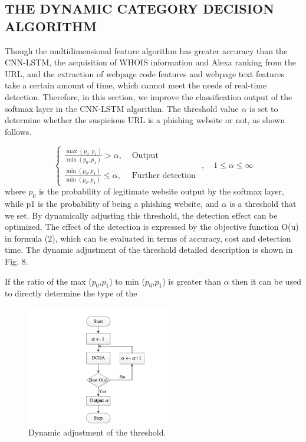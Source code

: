 \documentclass{ieeeaccess}
\begin{document}
\subsection{THE DYNAMIC CATEGORY DECISION ALGORITHM}
Though the multidimensional feature algorithm has greater
accuracy than the CNN-LSTM, the acquisition of WHOIS
information and Alexa ranking from the URL, and the extraction
of webpage code features and webpage text features take
a certain amount of time, which cannot meet the needs of
real-time detection. Therefore, in this section, we improve the
classification output of the softmax layer in the CNN-LSTM
algorithm. The threshold value $\alpha$ is set to determine whether
the suspicious URL is a phishing website or not, as shown
follows.\par
\begin{equation}
\left\{\begin{array}{ll}{\frac{\max \left(p_{0}, p_{1}\right)}{\min \left(p_{0}, p_{1}\right)}>\alpha,} & {\text { Output }} \\ {\frac{\min \left(p_{0}, p_{1}\right)}{\min \left(p_{0}, p_{1}\right)} \leq \alpha,} & {\text { Further detection }}\end{array}, \quad 1 \leq \alpha \leq \infty\right.
\end{equation}
where $p_{0}$ is the probability of legitimate website output by the softmax layer, while p1 is the probability of being a phishing
website, and $\alpha$ is a threshold that we set. By dynamically
adjusting this threshold, the detection effect can be optimized.
The effect of the detection is expressed by the objective
function O(u) in formula (2), which can be evaluated in terms
of accuracy, cost and detection time. The dynamic adjustment
of the threshold detailed description is shown in Fig. 8.
\par If the ratio of the max ($p_{0}$,$p_{1}$) to min ($p_{0}$,$p_{1}$) is greater than $\alpha$ then it can be used to directly determine the type of the
\begin{figure}
    \centering
    \includegraphics[width=\linewidth]{Figure8.png}
    \caption{Dynamic adjustment of the threshold.}
    \label{fig:8l}
\end{figure}
\end{document}
